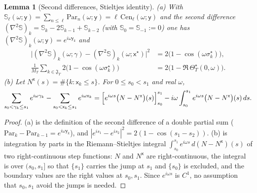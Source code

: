 \documentclass[11pt,a4paper]{article}
\numberwithin{equation}{section}
\newtheorem{lemma}[theorem]{Lemma}
\theoremstyle{definition}
\theoremstyle{remark}
\begin{document}
\begin{lemma}[Second differences, Stieltjes identity]\label{lem:v9-exact}
(a) With $\mathbb S_\ell(\omega;\mathsf y)=\sum_{n\le\ell}\mathrm{Par}_n(\omega;\mathsf y)=\ell\,\mathrm{Cen}_\ell(\omega;\mathsf y)$ and the second difference $(\nabla^2\mathbb S)_k=\mathbb S_k-2\mathbb S_{k-1}+\mathbb S_{k-2}$ (with $\mathbb S_0=\mathbb S_{-1}:=0$) one has $(\nabla^2\mathbb S)_k(\omega;\mathsf y)=e^{i\omega \mathsf y_k}$ and
\begin{equation}\label{eq:v9-seconddiff}
\begin{aligned}
\bigl|(\nabla^2\mathbb S)_k(\omega;\gamma)-(\nabla^2\mathbb S)_k(\omega;\mathsf x^\star)\bigr|^2
&=2\bigl(1-\cos(\omega\sigma_k^\star)\bigr),\\
\frac1{M_T}\sum_{k\in\mathfrak J_T}2\bigl(1-\cos(\omega\sigma_k^\star)\bigr)
&=2\bigl(1-\Re\,\Theta_T^\star(0,\omega)\bigr).
\end{aligned}
\end{equation}
(b) Let $N^{\mathsf x}(s)=\#\{k:\mathsf x_k\le s\}$. For $0\le s_0<s_1$ and real $\omega$,
\begin{equation}\label{eq:v9-stieltjes}
\sum_{s_0<\gamma_k\le s_1}e^{i\omega\gamma_k}-\sum_{s_0<\mathsf x_k\le s_1}e^{i\omega\mathsf x_k}
=\Bigl[e^{i\omega s}\bigl(N-N^{\mathsf x}\bigr)(s)\Bigr]_{s_0}^{s_1}
-i\omega\int_{s_0}^{s_1}e^{i\omega s}\bigl(N-N^{\mathsf x}\bigr)(s)\,ds .
\end{equation}
\end{lemma}
\begin{proof}
(a) is the definition of the second difference of a double partial sum ($\mathrm{Par}_k-\mathrm{Par}_{k-1}=e^{i\omega\mathsf y_k}$), and $|e^{is_1}-e^{is_2}|^2=2(1-\cos(s_1-s_2))$. (b) is integration by parts in the Riemann--Stieltjes integral $\int_{s_0}^{s_1}e^{i\omega s}\,d(N-N^{\mathsf x})(s)$ of two right-continuous step functions: $N$ and $N^{\mathsf x}$ are right-continuous, the integral is over $(s_0,s_1]$ so that $\{s_1\}$ carries the jump at $s_1$ and $\{s_0\}$ is excluded, and the boundary values are the right values at $s_0,s_1$. Since $e^{i\omega s}$ is $C^1$, no assumption that $s_0,s_1$ avoid the jumps is needed.
\end{proof}
\end{document}
